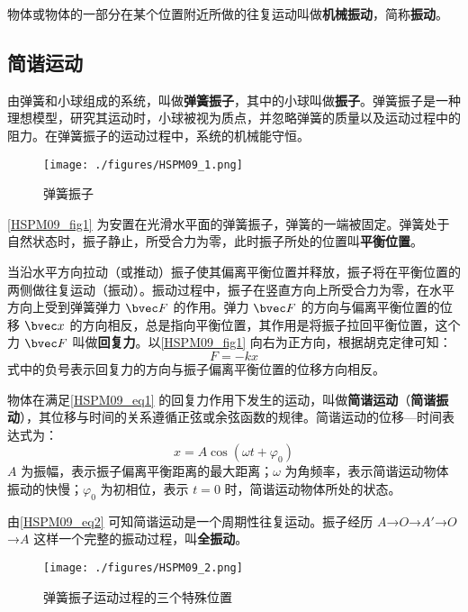 

物体或物体的一部分在某个位置附近所做的往复运动叫做\textbf{机械振动}，简称\textbf{振动}。

\subsection{简谐运动}

由弹簧和小球组成的系统，叫做\textbf{弹簧振子}，其中的小球叫做\textbf{振子}。弹簧振子是一种理想模型，研究其运动时，小球被视为质点，并忽略弹簧的质量以及运动过程中的阻力。在弹簧振子的运动过程中，系统的机械能守恒。

\begin{figure}[ht]
\centering
\texttt{[image: ./figures/HSPM09\_1.png]}
\caption{弹簧振子} \label{HSPM09_fig1}
\end{figure}

\autoref{HSPM09_fig1} 为安置在光滑水平面的弹簧振子，弹簧的一端被固定。弹簧处于自然状态时，振子静止，所受合力为零，此时振子所处的位置叫\textbf{平衡位置}。

当沿水平方向拉动（或推动）振子使其偏离平衡位置并释放，振子将在平衡位置的两侧做往复运动（振动）。振动过程中，振子在竖直方向上所受合力为零，在水平方向上受到弹簧弹力 $\bvec F$ 的作用。弹力 $\bvec F$ 的方向与偏离平衡位置的位移 $\bvec x$ 的方向相反，总是指向平衡位置，其作用是将振子拉回平衡位置，这个力 $\bvec F$ 叫做\textbf{回复力}。以\autoref{HSPM09_fig1} 向右为正方向，根据胡克定律可知：
\begin{equation}\label{HSPM09_eq1}
F=-kx
\end{equation}
式中的负号表示回复力的方向与振子偏离平衡位置的位移方向相反。

物体在满足\autoref{HSPM09_eq1} 的回复力作用下发生的运动，叫做\textbf{简谐运动}（\textbf{简谐振动}），其位移与时间的关系遵循正弦或余弦函数的规律。简谐运动的位移—时间表达式为：
\begin{equation}\label{HSPM09_eq2}
x=A\cos(\omega t + \varphi_0)
\end{equation}
$A$ 为振幅，表示振子偏离平衡距离的最大距离；$\omega$ 为角频率，表示简谐运动物体振动的快慢；$\varphi_0$ 为初相位，表示 $t=0$ 时，简谐运动物体所处的状态。

由\autoref{HSPM09_eq2} 可知简谐运动是一个周期性往复运动。振子经历 $A$→$O$→$A'$→$O$→$A$ 这样一个完整的振动过程，叫\textbf{全振动}。

\begin{figure}[ht]
\centering
\texttt{[image: ./figures/HSPM09\_2.png]}
\caption{弹簧振子运动过程的三个特殊位置} \label{HSPM09_fig2}
\end{figure}

